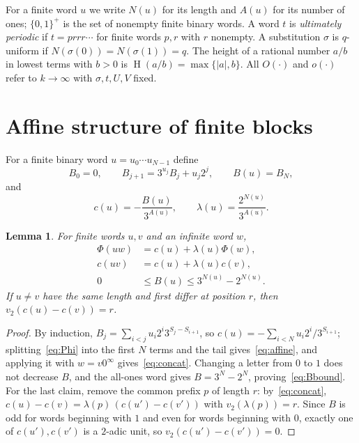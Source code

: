 \documentclass[11pt]{amsart}
\newtheorem{lemma}[theorem]{Lemma}
\theoremstyle{remark}
\theoremstyle{definition}
\numberwithin{equation}{section}
\newcommand{\Ht}{\operatorname{H}}
\newcommand{\vt}{v_2}
\begin{document}
For a finite word $u$ we write $N(u)$ for its length and $A(u)$ for its number of ones; $\{0,1\}^+$ is the set of nonempty finite binary words. A word $t$ is \emph{ultimately periodic} if $t=prrr\cdots$ for finite words $p,r$ with $r$ nonempty. A substitution $\sigma$ is $q$-uniform if $N(\sigma(0))=N(\sigma(1))=q$. The height of a rational number $a/b$ in lowest terms with $b>0$ is $\Ht(a/b)=\max\{|a|,b\}$. All $O(\cdot)$ and $o(\cdot)$ refer to $k\to\infty$ with $\sigma,t,U,V$ fixed.

\section{Affine structure of finite blocks}\label{sec:affine}

For a finite binary word $u=u_0\cdots u_{N-1}$ define
\begin{equation}\label{eq:B}
B_0=0,\qquad B_{j+1}=3^{u_j}B_j+u_j2^j,\qquad B(u)=B_N,
\end{equation}
and
\begin{equation}\label{eq:clambda}
c(u)=-\frac{B(u)}{3^{A(u)}},\qquad \lambda(u)=\frac{2^{N(u)}}{3^{A(u)}} .
\end{equation}

\begin{lemma}\label{lem:affine}
For finite words $u,v$ and an infinite word $w$,
\begin{align}
\Phi(uw)&=c(u)+\lambda(u)\Phi(w),\label{eq:affine}\\
c(uv)&=c(u)+\lambda(u)c(v),\label{eq:concat}\\
0&\le B(u)\le 3^{N(u)}-2^{N(u)} .\label{eq:Bbound}
\end{align}
If $u\ne v$ have the same length and first differ at position $r$, then $\vt(c(u)-c(v))=r$.
\end{lemma}

\begin{proof}
By induction, $B_j=\sum_{i<j}u_i2^i3^{S_j-S_{i+1}}$, so $c(u)=-\sum_{i<N}u_i2^i/3^{S_{i+1}}$; splitting~\eqref{eq:Phi} into the first $N$ terms and the tail gives~\eqref{eq:affine}, and applying it with $w=v0^\infty$ gives~\eqref{eq:concat}. Changing a letter from $0$ to $1$ does not decrease $B$, and the all-ones word gives $B=3^N-2^N$, proving~\eqref{eq:Bbound}. For the last claim, remove the common prefix $p$ of length $r$: by~\eqref{eq:concat}, $c(u)-c(v)=\lambda(p)\,(c(u')-c(v'))$ with $\vt(\lambda(p))=r$. Since $B$ is odd for words beginning with $1$ and even for words beginning with $0$, exactly one of $c(u'),c(v')$ is a $2$-adic unit, so $\vt(c(u')-c(v'))=0$.
\end{proof}
\end{document}
